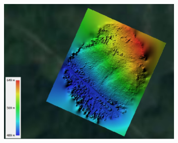 \begin{figure}[H]
	\centering
	\includegraphics[width=0.8\textwidth]{media/ict2/image204}
	\caption*{}
\end{figure}

